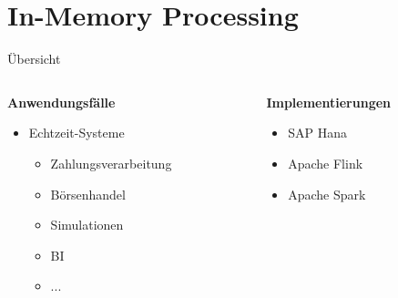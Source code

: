 \section{In-Memory Processing}
\begin{frame}{Übersicht}
	\begin{columns}[T]
		\begin{column}{0.45\textwidth}
			\textbf{Anwendungsfälle}
			\begin{itemize}
				\item Echtzeit-Systeme
				\begin{itemize}
					\item Zahlungsverarbeitung
					\item Börsenhandel
					\item Simulationen
					\item BI
					\item ...
				\end{itemize}
			\end{itemize}
		\end{column}
		\begin{column}{0.45\textwidth}
			\textbf{Implementierungen}
			\begin{itemize}
				\item SAP Hana
				\item Apache Flink
				\pause
				\item {}Apache Spark
			\end{itemize}
		\end{column}
	\end{columns}
\end{frame}